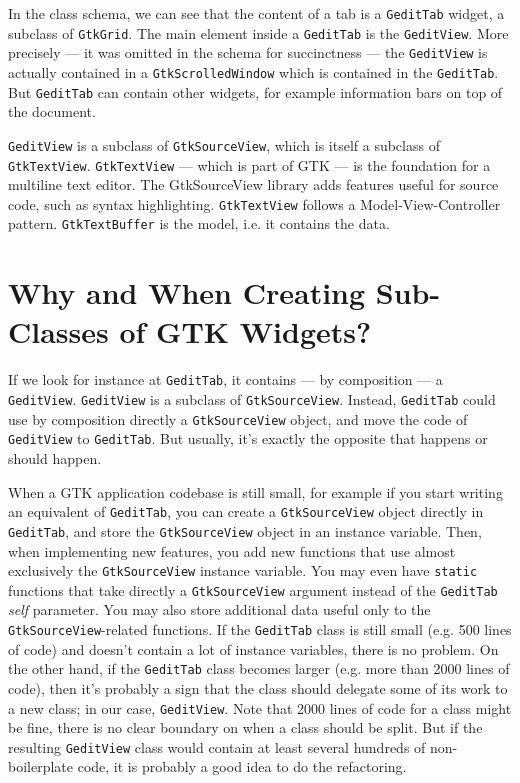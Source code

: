 In the class schema, we can see that the content of a tab is a \lstinline{GeditTab} widget, a subclass of \lstinline{GtkGrid}. The main element inside a \lstinline{GeditTab} is the \lstinline{GeditView}. More precisely --- it was omitted in the schema for succinctness --- the \lstinline{GeditView} is actually contained in a \lstinline{GtkScrolledWindow} which is contained in the \lstinline{GeditTab}. But \lstinline{GeditTab} can contain other widgets, for example information bars on top of the document.

\lstinline{GeditView} is a subclass of \lstinline{GtkSourceView}, which is itself a subclass of \lstinline{GtkTextView}. \lstinline{GtkTextView} --- which is part of GTK --- is the foundation for a multiline text editor. The GtkSourceView library adds features useful for source code, such as syntax highlighting. \lstinline{GtkTextView} follows a Model-View-Controller pattern. \lstinline{GtkTextBuffer} is the model, i.e. it contains the data.

\section{Why and When Creating Sub-Classes of GTK Widgets?}

If we look for instance at \lstinline{GeditTab}, it contains --- by composition --- a \lstinline{GeditView}. \lstinline{GeditView} is a subclass of \lstinline{GtkSourceView}. Instead, \lstinline{GeditTab} could use by composition directly a \lstinline{GtkSourceView} object, and move the code of \lstinline{GeditView} to \lstinline{GeditTab}. But usually, it's exactly the opposite that happens or should happen.

When a GTK application codebase is still small, for example if you start writing an equivalent of \lstinline{GeditTab}, you can create a \lstinline{GtkSourceView} object directly in \lstinline{GeditTab}, and store the \lstinline{GtkSourceView} object in an instance variable. Then, when implementing new features, you add new functions that use almost exclusively the \lstinline{GtkSourceView} instance variable. You may even have \lstinline{static} functions that take directly a \lstinline{GtkSourceView} argument instead of the \lstinline{GeditTab} \emph{self} parameter. You may also store additional data useful only to the \lstinline{GtkSourceView}-related functions. If the \lstinline{GeditTab} class is still small (e.g. 500 lines of code) and doesn't contain a lot of instance variables, there is no problem. On the other hand, if the \lstinline{GeditTab} class becomes larger (e.g. more than 2000 lines of code), then it's probably a sign that the class should delegate some of its work to a new class; in our case, \lstinline{GeditView}. Note that 2000 lines of code for a class might be fine, there is no clear boundary on when a class should be split. But if the resulting \lstinline{GeditView} class would contain at least several hundreds of non-boilerplate code, it is probably a good idea to do the refactoring.

